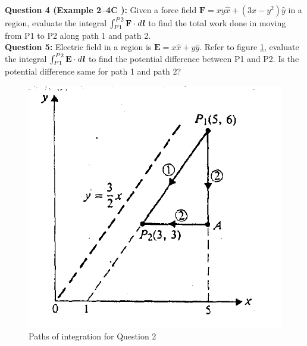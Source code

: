 \documentclass[12pt,a4paper]{article}
\begin{document}
\newpage
\noindent\textbf{Question 4 (Example 2--4C \cite[Example 2--4, page 23]{Cheng}):} Given a force field $\textbf{F}=xy\hat x+(3x-y^2)\hat y$ in a region, evaluate the integral $\int_{P1}^{P2}\textbf{F}\cdot d\textbf{\textit{l}}$ to find the total work done in moving from P1 to P2 along path 1 and path 2.\\[0.2cm]
\noindent\textbf{Question 5:} Electric field in a region is $\textbf{E}=x\hat x+y\hat y$. Refer to figure \ref{Cheng-integral}, evaluate the integral $\int_{P1}^{P2}\textbf{E}\cdot d\textbf{\textit{l}}$ to find the potential difference between P1 and P2. Is the potential difference same for path 1 and path 2?
\begin{figure}[H]
\centering
\includegraphics[scale=0.6]{Figure2-10Cheng.png}
\caption{Paths of integration for Question 2 \cite[Figure 2--10, page 23]{Cheng}}
\label{Cheng-integral}
\end{figure}


\end{document}
